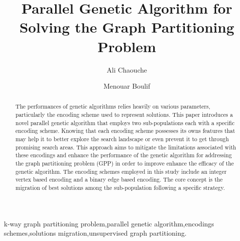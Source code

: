 \documentclass[review]{elsarticle}
\begin{document}
\begin{frontmatter}

\title{Parallel Genetic Algorithm for Solving the Graph Partitioning Problem }


\author[mymainaddress,mysecondaryaddress,institutionAdresse]{Ali Chaouche}

\author[mysecondaryaddress,institutionAdresse]{Menouar Boulif }



\address[mymainaddress]{LIMOSE Laboratory}
\address[mysecondaryaddress]{Departement of computer science}
\address[institutionAdresse]{University of M’hamed Bougara of Boumerdes, Facutly of Sciences. Avenue de l'indépendance, 35000. Boumerdes, Algeria}

\begin{abstract}
The performances of genetic algorithms relies heavily on various parameters, particularly the encoding scheme used to represent solutions. This paper introduces a novel parallel genetic algorithm that employs two sub-populations each with a specific encoding scheme. Knowing that each encoding scheme possesses its owns features that may help it to better explore the search landscape or even prevent it to get through promising search areas. This approach aims to mitigate the limitations associated with these encodings and enhance the performance of the genetic algorithm for addressing the graph partitioning problem (GPP) in order to improve enhance the efficacy of the genetic algorithm. The encoding schemes employed in this study include an integer vertex based encoding and a binary edge based encoding. The core concept is the migration of best solutions among the sub-population following a specific strategy. 
\end{abstract}

\begin{keyword}
	 \text k-way graph partitioning problem\sep parallel genetic algorithm\sep encodings schemes\sep solutions migration\sep unsupervised graph partitioning. 
\end{keyword}

\end{frontmatter}
\end{document}
